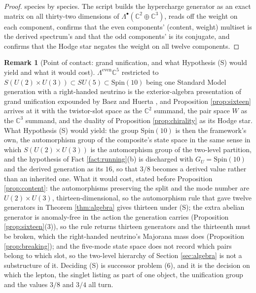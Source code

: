 \documentclass[11pt]{article}
\theoremstyle{definition}
\newtheorem{remark}[theorem]{Remark}
\newcommand{\C}{\mathbb{C}}
\begin{document}
\begin{proof}
species by species. The script builds the hypercharge generator as an exact matrix on all thirty-two dimensions of $\Lambda^{\bullet}(\C^{2} \oplus \C^{3})$, reads off the weight on each component, confirms that the even components' (content, weight) multiset is the derived spectrum's and that the odd components' is its conjugate, and confirms that the Hodge star negates the weight on all twelve components.
\end{proof}

\begin{remark}[Point of contact: grand unification, and what Hypothesis (S) would yield and what it would cost]\label{rem:sixteen}
$\Lambda^{\mathrm{even}}\C^{5}$ restricted to $S(U(2) \times U(3)) \subset SU(5) \subset \mathrm{Spin}(10)$ being one Standard Model generation with a right-handed neutrino is the exterior-algebra presentation of grand unification expounded by Baez and Huerta \cite{BaezHuerta2010}, and Proposition \ref{prop:sixteen} arrives at it with the twistor-slot space as the $\C^{2}$ summand, the pair space $W$ as the $\C^{3}$ summand, and the duality of Proposition \ref{prop:chirality} as its Hodge star. What Hypothesis (S) would yield: the group $\mathrm{Spin}(10)$ is then the framework's own, the automorphism group of the composite's state space in the same sense in which $S(U(2) \times U(3))$ is the automorphism group of the two-level partition, and the hypothesis of Fact \ref{fact:running}(b) is discharged with $G_{U} = \mathrm{Spin}(10)$ and the derived generation as its $16$, so that $3/8$ becomes a derived value rather than an inherited one. What it would cost, stated before Proposition \ref{prop:content}: the automorphisms preserving the split and the mode number are $U(2) \times U(3)$, thirteen-dimensional, so the automorphism rule that gave twelve generators in Theorem \ref{thm:algebra} gives thirteen under (S); the extra abelian generator is anomaly-free in the action the generation carries (Proposition \ref{prop:sixteen}(3)), so the rule returns thirteen generators and the thirteenth must be broken, which the right-handed neutrino's Majorana mass does (Proposition \ref{prop:breaking}); and the five-mode state space does not record which pairs belong to which slot, so the two-level hierarchy of Section \ref{sec:algebra} is not a substructure of it. Deciding (S) is successor problem (6), and it is the decision on which the lepton, the singlet listing as part of one object, the unification group and the values $3/8$ and $3/4$ all turn.
\end{remark}
\end{document}
